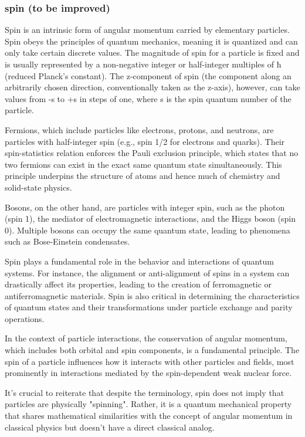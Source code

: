 \subsubsection{spin (to be improved)}

Spin is an intrinsic form of angular momentum carried by elementary particles. Spin obeys the principles of quantum mechanics, meaning it is quantized and can only take certain discrete values. The magnitude of spin for a particle is fixed and is usually represented by a non-negative integer or half-integer multiples of ħ (reduced Planck's constant). The z-component of spin (the component along an arbitrarily chosen direction, conventionally taken as the z-axis), however, can take values from -s to +s in steps of one, where s is the spin quantum number of the particle.

Fermions, which include particles like electrons, protons, and neutrons, are particles with half-integer spin (e.g., spin 1/2 for electrons and quarks). Their spin-statistics relation enforces the Pauli exclusion principle, which states that no two fermions can exist in the exact same quantum state simultaneously. This principle underpins the structure of atoms and hence much of chemistry and solid-state physics.

Bosons, on the other hand, are particles with integer spin, such as the photon (spin 1), the mediator of electromagnetic interactions, and the Higgs boson (spin 0). Multiple bosons can occupy the same quantum state, leading to phenomena such as Bose-Einstein condensates.

Spin plays a fundamental role in the behavior and interactions of quantum systems. For instance, the alignment or anti-alignment of spins in a system can drastically affect its properties, leading to the creation of ferromagnetic or antiferromagnetic materials. Spin is also critical in determining the characteristics of quantum states and their transformations under particle exchange and parity operations.

In the context of particle interactions, the conservation of angular momentum, which includes both orbital and spin components, is a fundamental principle. The spin of a particle influences how it interacts with other particles and fields, most prominently in interactions mediated by the spin-dependent weak nuclear force.

It's crucial to reiterate that despite the terminology, spin does not imply that particles are physically "spinning". Rather, it is a quantum mechanical property that shares mathematical similarities with the concept of angular momentum in classical physics but doesn't have a direct classical analog.

